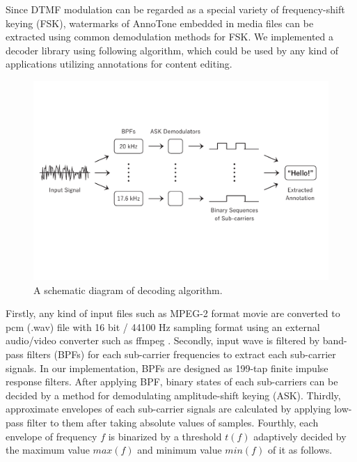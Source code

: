 Since DTMF modulation can be regarded as a special variety of frequency-shift keying (FSK), watermarks of AnnoTone embedded in media files can be extracted using common demodulation methods for FSK.
We implemented a decoder library using following algorithm, which could be used by any kind of applications utilizing annotations for content editing.

\begin{figure}[htbp]
 \begin{center}
  \vspace{5mm}
  \includegraphics[width=140mm]{implementation_decode.pdf}
 \end{center}
 \caption{A schematic diagram of decoding algorithm.}
 \label{fig:impl_decd}
\end{figure}

Firstly, any kind of input files such as MPEG-2 format movie are converted to pcm (.wav) file with 16 bit / 44100 Hz sampling format using an external audio/video converter such as ffmpeg \cite{ffmpeg}.
Secondly, input wave is filtered by band-pass filters (BPFs) for each sub-carrier frequencies to extract each sub-carrier signals.
In our implementation, BPFs are designed as 199-tap finite impulse response filters.
After applying BPF, binary states of each sub-carriers can be decided by a method for demodulating amplitude-shift keying (ASK).
Thirdly, approximate envelopes of each sub-carrier signals are calculated by applying low-pass filter to them after taking absolute values of samples.
Fourthly, each envelope of frequency $f$ is binarized by a threshold $t(f)$ adaptively decided by the maximum value $max(f)$ and minimum value $min(f)$ of it as follows.

